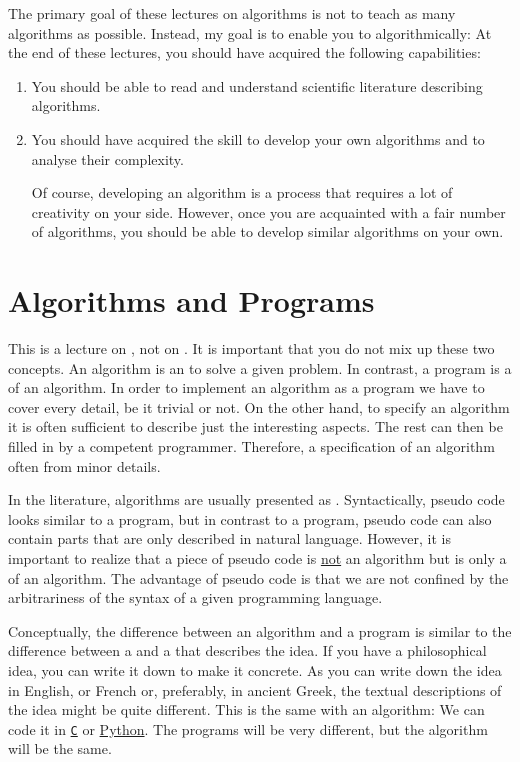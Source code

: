 The primary goal of these lectures on algorithms is not to teach as many algorithms as possible.
Instead, my goal is to enable you to  algorithmically:  At the end of these
lectures, you should have acquired the following capabilities:
\begin{enumerate}
\item You should be able to read and understand scientific literature describing algorithms.
\item You should have acquired the skill to develop your own algorithms and to analyse their complexity.

      Of course, developing an algorithm is a process that requires a lot of creativity on your side.  However,
      once you are acquainted with a fair number of algorithms, you should be able to develop similar
      algorithms on your own. 
\end{enumerate}


\section{Algorithms and Programs}
This is a lecture on , not on .  It is important that you do not mix up
these two concepts.  An algorithm  is an  to solve a given problem.  In
contrast, a program is a  of an algorithm.  In order to implement an
algorithm as a program we have to cover every detail, be it trivial or not.  On the other hand, 
to specify an algorithm it is often sufficient to describe just the interesting aspects.  The rest can then be
filled in by a competent programmer.  Therefore, a specification of an algorithm often  from minor
details. 

In the literature, algorithms are usually presented as . 
Syntactically, pseudo code looks
similar to a program, but in contrast to a program, pseudo code can also contain parts that are only
described in natural language.   However, it is important to realize that a piece of pseudo code is
\underline{not} an algorithm but is only a  of an algorithm.  The
advantage of pseudo code is that we are not confined by the arbitrariness of the syntax of a given
programming language.

Conceptually, the difference between an algorithm and a program is similar to the difference between
a  and a  that describes the idea.  If you have a philosophical idea, you
can write it down to make it concrete.  As you can write down the idea in English, or French or, preferably, in
ancient Greek, the textual descriptions of the idea might be quite different.  This is the same with an algorithm:
We can code it in \href{https://en.wikipedia.org/wiki/C_(programming_language)}{\texttt{C}} or
\href{http://python.org}{Python}.  The programs will be very different, but the algorithm will be the same. 


